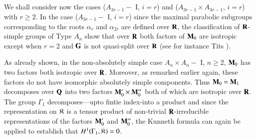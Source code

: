 \subsection{}\label{art9-subsec5.25}
We shall consider now the cases ($A_{3r-1} - $ I, $i=r$) and ($A_{3r-1} \times A_{3r-1}$, $i = r$) with $r \geqslant 2$. In the case ($A_{3r-1} -$ I, $i=r$) since the maximal parabolic subgroups corresponding to the roots $\alpha_r$  and $\alpha_{2r}$ are defined over $\mathbf{R}$, the classification of $\mathbf{R}$-simple groups of Type $A_n$ show that over $\mathbf{R}$ both factors of $\mathbf{M}_0$ are isotropic except when $r = 2$ and $\mathbf{G}$ is not quasi-split over $\mathbf{R}$ (see for instance Tits \cite{art9-key1}).

As already shown, in the non-absolutely simple case $A_n \times A_n - $ I, $n \geqslant 2$, $\mathbf{M}_0$ has two factors both isotropic over $\mathbf{R}$. Moreover, as remarked earlier again, these factors do not have isomorphic absolutely simple components. Thus $\mathbf{M}_0 = \mathbf{M}_1$ decomposes over $\mathbf{Q}$ into two factors $\mathbf{M}'_0 \times \mathbf{M}''_0$ both of which are isotropic over $\mathbf{R}$. The group $\Gamma_1$ decomposes---upto fintie index-into a product and since the representation on $\mathfrak{K}$ is a tensor product of non-trivial $\mathbf{R}$-irreducible representations of the factors $\mathbf{M}'_0$ and $\mathbf{M}''_0$, the Kunneth formula can again be applied to establish that $H^1 (\Gamma_1, \mathfrak{K}) =0$.

